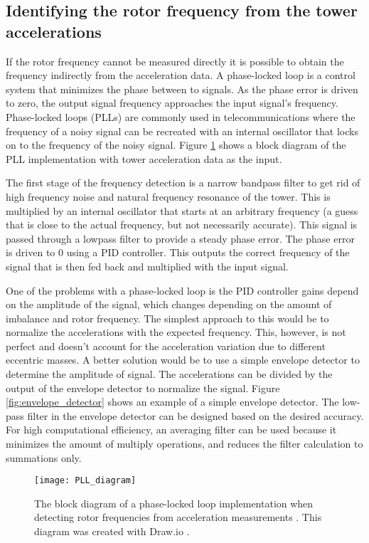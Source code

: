 \subsection{Identifying the rotor frequency from the tower accelerations}
If the rotor frequency cannot be measured directly it is possible to obtain the frequency indirectly from the acceleration data.  A phase-locked loop is a control system that minimizes the phase between to signals.  As the phase error is driven to zero, the output signal frequency approaches the input signal's frequency.  Phase-locked loops (PLLs) are commonly used in telecommunications where the frequency of a noisy signal can be recreated with an internal oscillator that locks on to the frequency of the noisy signal.  Figure \ref{fig:PLL_diagram} shows a block diagram of the PLL implementation with tower acceleration data as the input.

The first stage of the frequency detection is a narrow bandpass filter to get rid of high frequency noise and natural frequency resonance of the tower.  This is multiplied by an internal oscillator that starts at an arbitrary frequency (a guess that is close to the actual frequency, but not necessarily accurate).  This signal is passed through a lowpass filter to provide a steady phase error.  The phase error is driven to 0 using a PID controller.  This outputs the correct frequency of the signal that is then fed back and multiplied with the input signal.

One of the problems with a phase-locked loop is the PID controller gains depend on the amplitude of the signal, which changes depending on the amount of imbalance and rotor frequency.  The simplest approach to this would be to normalize the accelerations with the expected frequency.  This, however, is not perfect and doesn't account for the acceleration variation due to different eccentric masses.  A better solution would be to use a simple envelope detector to determine the amplitude of signal.  The accelerations can be divided by the output of the envelope detector to normalize the signal.  Figure \ref{fig:envelope_detector} shows an example of a simple envelope detector\cite{envelope_detector_ref}.  The low-pass filter in the envelope detector can be designed based on the desired accuracy.  For high computational efficiency, an averaging filter can be used because it minimizes the amount of multiply operations, and reduces the filter calculation to summations only.

\begin{figure}
	\centering
	\texttt{[image: PLL\_diagram]}
	\decoRule
	\caption{The block diagram of a phase-locked loop implementation when detecting rotor frequencies from acceleration measurements \cite{embedded_zoom_fft}.  This diagram was created with Draw.io \cite{draw_io}.}
	\label{fig:PLL_diagram}
\end{figure}

